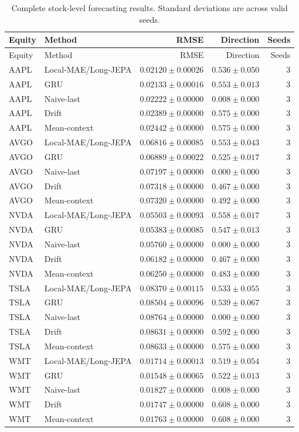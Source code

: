 \begin{longtable}{llrrr}
\caption{Complete stock-level forecasting results. Standard deviations are across valid seeds.}\label{tab:appendix_stock_metrics}\\
\toprule
Equity & Method & RMSE & Direction & Seeds \\
\midrule
\endfirsthead
\toprule
Equity & Method & RMSE & Direction & Seeds \\
\midrule
\endhead
AAPL & Local-MAE/Long-JEPA & $0.02120 \pm 0.00026$ & $0.536 \pm 0.050$ & 3 \\
AAPL & GRU & $0.02133 \pm 0.00016$ & $0.553 \pm 0.013$ & 3 \\
AAPL & Naive-last & $0.02222 \pm 0.00000$ & $0.008 \pm 0.000$ & 3 \\
AAPL & Drift & $0.02389 \pm 0.00000$ & $0.575 \pm 0.000$ & 3 \\
AAPL & Mean-context & $0.02442 \pm 0.00000$ & $0.575 \pm 0.000$ & 3 \\
AVGO & Local-MAE/Long-JEPA & $0.06816 \pm 0.00085$ & $0.553 \pm 0.043$ & 3 \\
AVGO & GRU & $0.06889 \pm 0.00022$ & $0.525 \pm 0.017$ & 3 \\
AVGO & Naive-last & $0.07197 \pm 0.00000$ & $0.000 \pm 0.000$ & 3 \\
AVGO & Drift & $0.07318 \pm 0.00000$ & $0.467 \pm 0.000$ & 3 \\
AVGO & Mean-context & $0.07320 \pm 0.00000$ & $0.492 \pm 0.000$ & 3 \\
NVDA & Local-MAE/Long-JEPA & $0.05503 \pm 0.00093$ & $0.558 \pm 0.017$ & 3 \\
NVDA & GRU & $0.05383 \pm 0.00085$ & $0.547 \pm 0.013$ & 3 \\
NVDA & Naive-last & $0.05760 \pm 0.00000$ & $0.000 \pm 0.000$ & 3 \\
NVDA & Drift & $0.06182 \pm 0.00000$ & $0.467 \pm 0.000$ & 3 \\
NVDA & Mean-context & $0.06250 \pm 0.00000$ & $0.483 \pm 0.000$ & 3 \\
TSLA & Local-MAE/Long-JEPA & $0.08370 \pm 0.00115$ & $0.533 \pm 0.055$ & 3 \\
TSLA & GRU & $0.08504 \pm 0.00096$ & $0.539 \pm 0.067$ & 3 \\
TSLA & Naive-last & $0.08764 \pm 0.00000$ & $0.000 \pm 0.000$ & 3 \\
TSLA & Drift & $0.08631 \pm 0.00000$ & $0.592 \pm 0.000$ & 3 \\
TSLA & Mean-context & $0.08633 \pm 0.00000$ & $0.575 \pm 0.000$ & 3 \\
WMT & Local-MAE/Long-JEPA & $0.01714 \pm 0.00013$ & $0.519 \pm 0.054$ & 3 \\
WMT & GRU & $0.01548 \pm 0.00065$ & $0.522 \pm 0.013$ & 3 \\
WMT & Naive-last & $0.01827 \pm 0.00000$ & $0.008 \pm 0.000$ & 3 \\
WMT & Drift & $0.01747 \pm 0.00000$ & $0.608 \pm 0.000$ & 3 \\
WMT & Mean-context & $0.01763 \pm 0.00000$ & $0.608 \pm 0.000$ & 3 \\
\bottomrule
\end{longtable}
